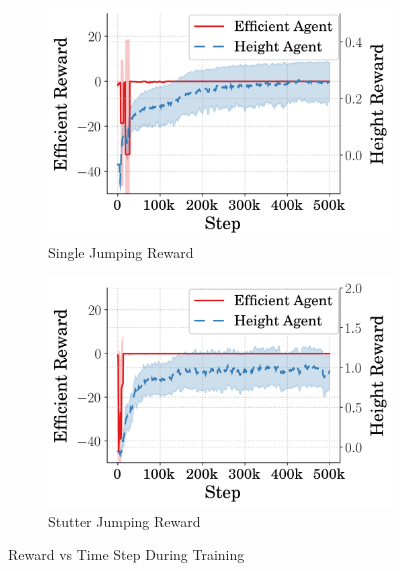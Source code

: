 \begin{figure}[tb!]
  \centering
  \begin{subfigure}{.49\textwidth}
    \centering
    \includegraphics[width=\linewidth]{Figures/Ch2/RewVsTimeOne.png}
    \caption{Single Jumping Reward}
    \label{fig:avg_one_rew}
  \end{subfigure}%
  \hfill
  \begin{subfigure}{.49\textwidth}
    \centering
    \includegraphics[width=\linewidth]{Figures/Ch2//RewVsTimeStutter.png}
     \caption{Stutter Jumping Reward}
     \label{fig:avg_stutter_rew}
  \end{subfigure}
   \caption{Reward vs Time Step During Training}
   \label{fig:avg_rew}
\end{figure}
% 

